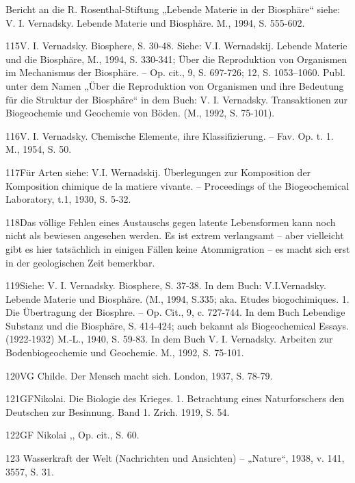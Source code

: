 \documentclass[11pt,a4paper]{book}
\begin{document}
Bericht an die R. Rosenthal-Stiftung „Lebende Materie in der Biosphäre“ siehe: V. I. Vernadsky. Lebende Materie und Biosphäre. M., 1994, S. 555-602.



115V. I. Vernadsky. Biosphere, S. 30-48. Siehe: V.I. Wernadskij. Lebende Materie und die Biosphäre, M., 1994, S. 330-341; Über die Reproduktion von Organismen im Mechanismus der Biosphäre. -- Op. cit., 9, S. 697-726; 12, S. 1053–1060. Publ. unter dem Namen „Über die Reproduktion von Organismen und ihre Bedeutung für die Struktur der Biosphäre“ in dem Buch: V. I. Vernadsky. Transaktionen zur Biogeochemie und Geochemie von Böden. (M., 1992, S. 75-101).



116V. I. Vernadsky. Chemische Elemente, ihre Klassifizierung. -- Fav. Op. t. 1. M., 1954, S. 50.



117Für Arten siehe: V.I. Wernadskij. Überlegungen zur Komposition der Komposition chimique de la matiere vivante. -- Proceedings of the Biogeochemical Laboratory, t.1, 1930, S. 5-32.



118Das völlige Fehlen eines Austauschs gegen latente Lebensformen kann noch nicht als bewiesen angesehen werden. Es ist extrem verlangsamt -- aber vielleicht gibt es hier tatsächlich in einigen Fällen keine Atommigration -- es macht sich erst in der geologischen Zeit bemerkbar.



119Siehe: V. I. Vernadsky. Biosphere, S. 37-38. In dem Buch: V.I.Vernadsky. Lebende Materie und Biosphäre. (M., 1994, S.335; aka. Etudes biogochimiques. 1. Die Übertragung der Biosphre. -- Op. Cit., 9, c. 727-744. In dem Buch Lebendige Substanz und die Biosphäre, S. 414-424; auch bekannt als Biogeochemical Essays. (1922-1932) M.-L., 1940, S. 59-83. In dem Buch V. I. Vernadsky. Arbeiten zur Bodenbiogeochemie und Geochemie. M., 1992, S. 75-101.



120VG Childe. Der Mensch macht sich. London, 1937, S. 78-79.



121GFNikolai. Die Biologie des Krieges. 1. Betrachtung eines Naturforschers den Deutschen zur Besinnung. Band 1. Zrich. 1919, S. 54.



122GF Nikolai ,, Op. cit., S. 60.



123 Wasserkraft der Welt (Nachrichten und Ansichten) -- „Nature“, 1938, v. 141, 3557, S. 31.
\end{document}
